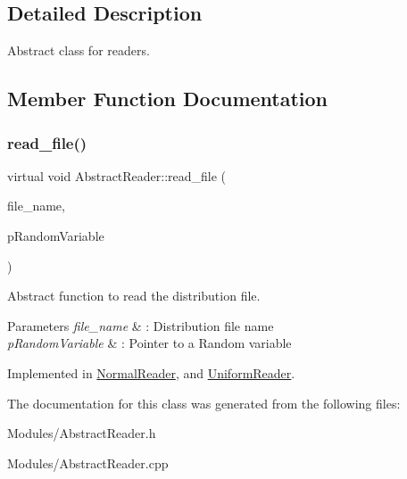 \subsection{Detailed Description}
Abstract class for readers. 

\subsection{Member Function Documentation}
\mbox{\label{classAbstractReader_a01d009f3633d0af6d9ea8e34defda7f5}} 
\subsubsection{\texorpdfstring{read\+\_\+file()}{read\_file()}}
{\footnotesize\ttfamily virtual void Abstract\+Reader\+::read\+\_\+file (\begin{DoxyParamCaption}\item[{const char $\ast$}]{file\+\_\+name,  }\item[{\hyperlink{classAbstractVariable}{Abstract\+Variable} $\ast$\&}]{p\+Random\+Variable }\end{DoxyParamCaption})\hspace{0.3cm}{\ttfamily [pure virtual]}}



Abstract function to read the distribution file. 


\begin{DoxyParams}{Parameters}
{\em file\+\_\+name} & \+: Distribution file name \\
\hline
{\em p\+Random\+Variable} & \+: Pointer to a Random variable \\
\hline
\end{DoxyParams}


Implemented in \hyperlink{classNormalReader_ae6571e3fdc414f143a5541807eded6e0}{Normal\+Reader}, and \hyperlink{classUniformReader_ae4e326a00cd72cdc1afa73beebe60ddc}{Uniform\+Reader}.



The documentation for this class was generated from the following files\+:\begin{DoxyCompactItemize}
\item 
Modules/Abstract\+Reader.\+h\item 
Modules/Abstract\+Reader.\+cpp\end{DoxyCompactItemize}
